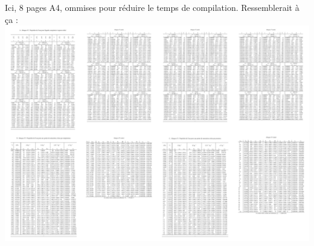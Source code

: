 \begin{center}
	Ici, 8 pages A4, ommises pour réduire le temps de compilation. Ressemblerait à ça :
	\includegraphics[width=\textwidth]{images/abaques.png}
\end{center}
